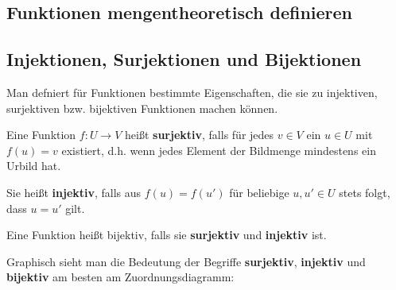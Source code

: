 \documentclass[../../main.tex]{subfiles}
\begin{document}
\subsection*{Funktionen mengentheoretisch definieren}


\subsection*{Injektionen, Surjektionen und Bijektionen}
\pagecolor{violet!20}
\label{advanced:bijektion}
Man defniert für Funktionen bestimmte Eigenschaften, die sie zu injektiven, surjektiven bzw. bijektiven Funktionen machen können.

\begin{definition}{}
    Eine Funktion $f\colon U\rightarrow V$ heißt \textbf{surjektiv}, falls für jedes $v\in V$ ein $u\in U$ mit $f(u)=v$ existiert, d.h. wenn jedes Element der Bildmenge mindestens ein Urbild hat.
    
    Sie heißt \textbf{injektiv}, falls aus $f(u)=f(u')$ für beliebige $u,u'\in U$ stets folgt, dass $u=u'$ gilt. 
    
    Eine Funktion heißt bijektiv, falls sie \textbf{surjektiv} und \textbf{injektiv} ist.
\end{definition}

Graphisch sieht man die Bedeutung der Begriffe \textbf{surjektiv}, \textbf{injektiv} und \textbf{bijektiv} am besten am Zuordnungsdiagramm:
    
\begin{multicols}{3}\centering
    
    
    
\end{multicols}
\end{document}
